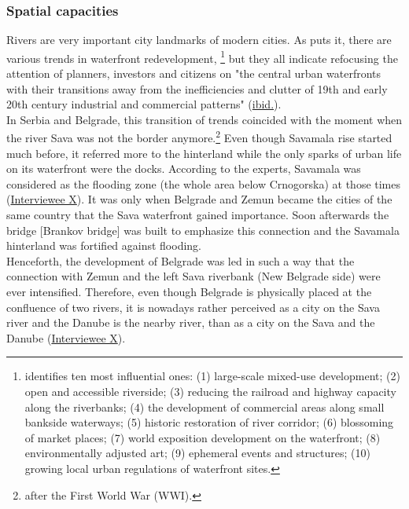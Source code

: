 \documentclass[11pt]{report}
\begin{document}
\subsubsection{Spatial capacities}

Rivers are very important city landmarks of modern cities. %
As \href{Mann1988}{\cite{mann_ten_1988}} puts it, there are various trends in waterfront redevelopment,
\footnote{\href{Mann1988}{\cite{mann_ten_1988}} identifies ten most influential ones:
(1) large-scale mixed-use development;
(2) open and accessible riverside;
(3) reducing the railroad and highway capacity along the riverbanks;
(4) the development of commercial areas along small bankside waterways; 
(5) historic restoration of river corridor;
(6) blossoming of market places;
(7) world exposition development on the waterfront;
(8) environmentally adjusted art;
(9) ephemeral events and structures;
(10) growing local urban regulations of waterfront sites.}
but they all indicate refocusing the attention of planners, investors and citizens on "the central urban waterfronts with their transitions away from the inefficiencies and clutter of 19th and early 20th century industrial and commercial patterns" (\href{Mann1988}{ibid.}).
\\

In Serbia and Belgrade, this transition of trends coincided with the moment when the river Sava was not the border anymore.\footnote{after the First World War (WWI).}
Even though Savamala rise started much before, it referred more to the hinterland while the only sparks of urban life on its waterfront were the docks.
According to the experts, Savamala was considered as the flooding zone (the whole area below Crnogorska) at those times (\href{InterviewX}{Interviewee X}).
It was only when Belgrade and Zemun became the cities of the same country that the Sava waterfront gained importance. Soon afterwards the bridge [Brankov bridge] was built to emphasize this connection and the Savamala hinterland was fortified against flooding.
\\

Henceforth, the development of Belgrade was led in such a way that the connection with Zemun and the left Sava riverbank (New Belgrade side) were ever intensified.
Therefore, even though Belgrade is physically placed at the confluence of two rivers, it is nowadays rather perceived as a city on the Sava river and the Danube is the nearby river, than as a city on the Sava and the Danube (\href{InterviewX}{Interviewee X}).
\\
\end{document}
